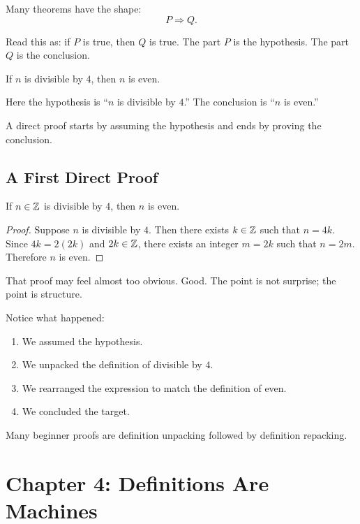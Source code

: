 \documentclass[11pt]{article}
\begin{document}
Many theorems have the shape:
\[
P\Rightarrow Q.
\]

Read this as: if $P$ is true, then $Q$ is true. The part $P$ is the hypothesis. The part $Q$ is the conclusion.

\begin{example}
If $n$ is divisible by $4$, then $n$ is even.
\end{example}

Here the hypothesis is ``$n$ is divisible by $4$.'' The conclusion is ``$n$ is even.''

A direct proof starts by assuming the hypothesis and ends by proving the conclusion.

\subsection{A First Direct Proof}

\begin{theorem}
If $n\in\mathbb{Z}$ is divisible by $4$, then $n$ is even.
\end{theorem}

\begin{proof}
Suppose $n$ is divisible by $4$. Then there exists $k\in\mathbb{Z}$ such that $n=4k$. Since $4k=2(2k)$ and $2k\in\mathbb{Z}$, there exists an integer $m=2k$ such that $n=2m$. Therefore $n$ is even.
\end{proof}

That proof may feel almost too obvious. Good. The point is not surprise; the point is structure.

Notice what happened:

\begin{enumerate}
\item We assumed the hypothesis.
\item We unpacked the definition of divisible by $4$.
\item We rearranged the expression to match the definition of even.
\item We concluded the target.
\end{enumerate}

\begin{focusbox}
Many beginner proofs are definition unpacking followed by definition repacking.
\end{focusbox}

\section{Chapter 4: Definitions Are Machines}
\end{document}
